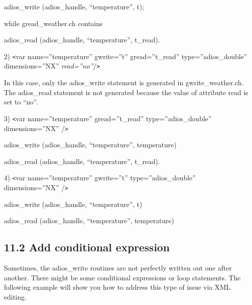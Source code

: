 \vspace{10pt}
adios\_write (adios\_handle, ``temperature'', t);

\vspace{10pt}
while gread\_weather.ch contains

\vspace{10pt}
adios\_read (adios\_handle, ``temperature'', t\_read).

\vspace{10pt}
2) \texttt{<}var name=''temperature'' gwrite=''t'' gread=''t\_read'' type=''adios\_double'' 
dimensions=''NX'' \textit{read=''no''}/\texttt{>}

\vspace{10pt}
In this case, only the adios\_write statement is generated in gwrite\_weather.ch. 
The adios\_read statement is not generated because the value of attribute read 
is set to ``no''. 

\vspace{10pt}
3) \texttt{<}var name=''temperature'' gread=''t\_read'' type=''adios\_double'' 
dimensions=''NX'' /\texttt{>}

\vspace{10pt}
adios\_write (adios\_handle, ``temperature'', temperature)

\vspace{10pt}
adios\_read (adios\_handle, ``temperature'', t\_read).

\vspace{10pt}
4) \texttt{<}var name=''temperature'' gwrite=''t'' type=''adios\_double'' dimensions=''NX'' 
/\texttt{>}

\vspace{10pt}
adios\_write (adios\_handle, ``temperature'', t)

\vspace{10pt}
adios\_read (adios\_handle, ``temperature'', temperature)\label{HToc84890288}\label{HToc212016664}\label{HToc212016906}\label{HToc182553437}

\vspace{10pt}
\subsection*{{\large 11.2 }{\large \textbf{Add conditional expression}}}

\vspace{10pt}
Sometimes, the adios\_write routines are not perfectly written out one after another. 
There might be some conditional expressions or loop statements. The following example 
will show you how to address this type of issue via XML editing.

